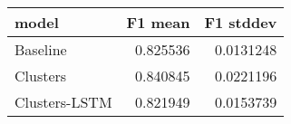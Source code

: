 \begin{tabular}{lrr}
\toprule
 model         &   F1 mean &   F1 stddev \\
\midrule
 Baseline      &  0.825536 &   0.0131248 \\
 Clusters      &  0.840845 &   0.0221196 \\
 Clusters-LSTM &  0.821949 &   0.0153739 \\
\bottomrule
\end{tabular}